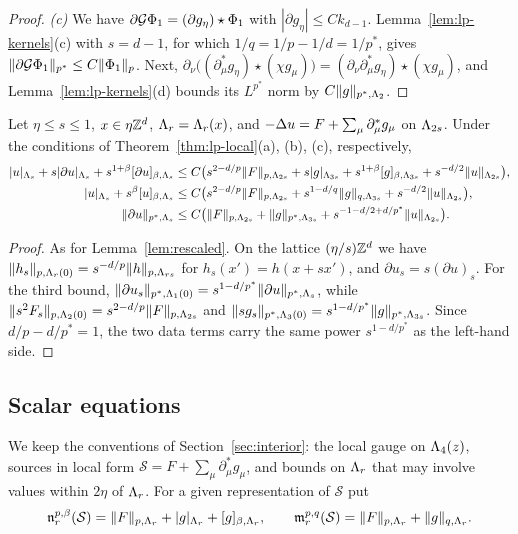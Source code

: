 \begin{proof}
\emph{(c)} We have $\partial\mathcal G\Phi_1=(\partial g_\eta)\star\Phi_1$ with $|\partial g_\eta|\le Ck_{d-1}$. Lemma~\ref{lem:lp-kernels}(c) with $s=d-1$, for which $1/q=1/p-1/d=1/p^*$, gives $\|\partial\mathcal G\Phi_1\|_{p^*}\le C\|\Phi_1\|_p$. Next, $\partial_\nu\big((\partial^*_\mu g_\eta)\star(\chi g_\mu)\big)=(\partial_\nu\partial^*_\mu g_\eta)\star(\chi g_\mu)$, and Lemma~\ref{lem:lp-kernels}(d) bounds its $L^{p^*}$ norm by $C\|g\|_{p^*,\Lambda_2}$.
\end{proof}

\begin{lemma}\label{lem:rescaled-lp}
Let $\eta\le s\le1$, $x\in\eta\mathbb Z^d$, $\Lambda_r=\Lambda_r(x)$, and $-\Delta u=F+\sum_\mu\partial^*_\mu g_\mu$ on $\Lambda_{2s}$. Under the conditions of Theorem~\ref{thm:lp-local}(a), (b), (c), respectively,
\begin{align*}
|u|_{\Lambda_s}+s|\partial u|_{\Lambda_s}+s^{1+\beta}[\partial u]_{\beta,\Lambda_s}&\le C\big(s^{2-d/p}\|F\|_{p,\Lambda_{2s}}+s|g|_{\Lambda_{3s}}+s^{1+\beta}[g]_{\beta,\Lambda_{3s}}+s^{-d/2}\|u\|_{\Lambda_{2s}}\big),\\
|u|_{\Lambda_s}+s^\beta[u]_{\beta,\Lambda_s}&\le C\big(s^{2-d/p}\|F\|_{p,\Lambda_{2s}}+s^{1-d/q}\|g\|_{q,\Lambda_{3s}}+s^{-d/2}\|u\|_{\Lambda_{2s}}\big),\\
\|\partial u\|_{p^*,\Lambda_s}&\le C\big(\|F\|_{p,\Lambda_{2s}}+\|g\|_{p^*,\Lambda_{3s}}+s^{-1-d/2+d/p^*}\|u\|_{\Lambda_{2s}}\big).
\end{align*}
\end{lemma}

\begin{proof}
As for Lemma~\ref{lem:rescaled}. On the lattice $(\eta/s)\mathbb Z^d$ we have $\|h_s\|_{p,\Lambda_r(0)}=s^{-d/p}\|h\|_{p,\Lambda_{rs}}$ for $h_s(x')=h(x+sx')$, and $\partial u_s=s(\partial u)_s$. For the third bound, $\|\partial u_s\|_{p^*,\Lambda_1(0)}=s^{1-d/p^*}\|\partial u\|_{p^*,\Lambda_s}$, while $\|s^2F_s\|_{p,\Lambda_2(0)}=s^{2-d/p}\|F\|_{p,\Lambda_{2s}}$ and $\|sg_s\|_{p^*,\Lambda_3(0)}=s^{1-d/p^*}\|g\|_{p^*,\Lambda_{3s}}$. Since $d/p-d/p^*=1$, the two data terms carry the same power $s^{1-d/p^*}$ as the left-hand side.
\end{proof}

\subsection{Scalar equations}

We keep the conventions of Section~\ref{sec:interior}: the local gauge on $\Lambda_4(z)$, sources in local form $\mathcal S=F+\sum_\mu\partial^*_\mu g_\mu$, and bounds on $\Lambda_r$ that may involve values within $2\eta$ of $\Lambda_r$. For a given representation of $\mathcal S$ put
\[
\mathfrak n^{p,\beta}_r(\mathcal S)=\|F\|_{p,\Lambda_r}+|g|_{\Lambda_r}+[g]_{\beta,\Lambda_r},\qquad\mathfrak m^{p,q}_r(\mathcal S)=\|F\|_{p,\Lambda_r}+\|g\|_{q,\Lambda_r}.
\]

